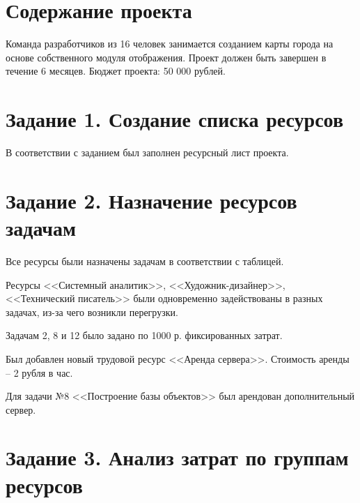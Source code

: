 \documentclass{bmstu}
\begin{document}

\section*{Содержание проекта}

Команда разработчиков из 16 человек занимается созданием карты города на основе собственного модуля отображения. Проект должен быть завершен в течение 6 месяцев. Бюджет проекта: 50 000 рублей.

\section*{Задание 1. Создание списка ресурсов}

В соответствии с заданием был заполнен ресурсный лист проекта.


\clearpage

\section*{Задание 2. Назначение ресурсов задачам}

Все ресурсы были назначены задачам в соответствии с таблицей.


Ресурсы <<Системный аналитик>>, <<Художник-дизайнер>>, <<Технический писатель>> были одновременно задействованы в разных задачах, из-за чего возникли перегрузки.


Задачам 2, 8 и 12 было задано по 1000 р. фиксированных затрат.

\clearpage

Был добавлен новый трудовой ресурс <<Аренда сервера>>.
Стоимость аренды -- 2 рубля в час.


Для задачи №8 <<Построение базы объектов>> был арендован дополнительный сервер.



\clearpage

\section*{Задание 3. Анализ затрат по группам ресурсов}
\end{document}

